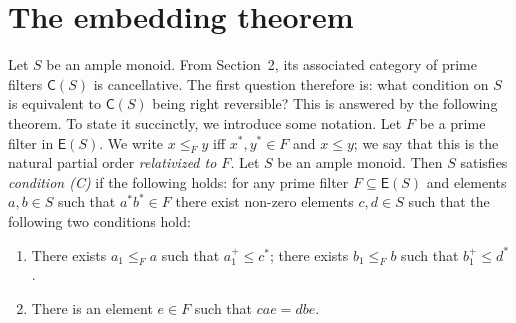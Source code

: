 \documentclass[a4paper]{amsart}
\begin{document}
\section{The embedding theorem}

Let $S$ be an ample monoid.
From Section~2, its associated category of prime filters $\mathsf{C}(S)$ is cancellative.
The first question therefore is: what condition on $S$ is equivalent to $\mathsf{C}(S)$ being right reversible?
This is answered by the following theorem.
To state it succinctly, we introduce some notation.
Let $F$ be a prime filter in $\mathsf{E}(S)$.
We write $x \leq_{F} y$ iff $x^{\ast}, y^{\ast} \in F$ and $x \leq y$;
we say that this is the natural partial order {\em relativized to $F$}. 
Let $S$ be an ample monoid.
Then $S$ satisfies {\em condition (C)} if the following holds:
for any prime filter $F \subseteq \mathsf{E}(S)$ and elements $a, b \in S$
such that $a^{\ast}b^{\ast} \in F$ there exist non-zero elements $c,d \in S$ such that 
the following two conditions hold:
\begin{enumerate}  
\item There exists $a_{1} \leq_{F} a$ such that $a_{1}^{+} \leq c^{\ast}$;
there exists $b_{1} \leq_{F} b$ such that $b_{1}^{+} \leq d^{\ast}$.
\item There is an element $e \in F$ such that $cae = dbe$. 
\end{enumerate}
\end{document}
